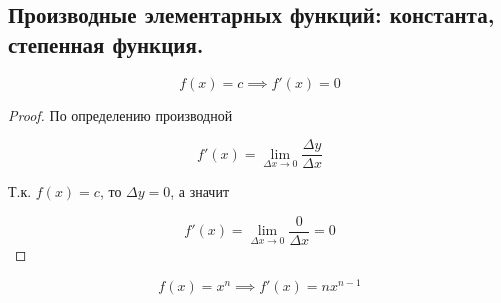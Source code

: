 \subsection{%
  Производные элементарных функций: константа, степенная функция.%
}

\begin{theorem}
  \begin{equation*}
    f(x) = c \implies f'(x) = 0
  \end{equation*}
\end{theorem}

\begin{proof}
  По определению производной

  \begin{equation*}
    f'(x) = \lim_{\Delta x \to 0} \frac{\Delta y}{\Delta x}
  \end{equation*}

  Т.к. \(f(x) = c\), то \(\Delta y = 0\), а значит

  \begin{equation*}
    f'(x) = \lim_{\Delta x \to 0} \frac{0}{\Delta x} = 0
  \end{equation*}
\end{proof}

\begin{theorem}
  \begin{equation*}
    f(x) = x^n \implies f'(x) = n x^{n - 1}
  \end{equation*}
\end{theorem}

